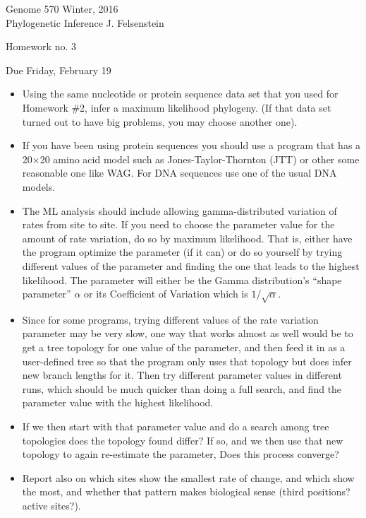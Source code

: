 \documentclass[12pt]{article}
\begin{document}
{\large
\noindent
Genome 570 \hfill Winter, 2016\\
Phylogenetic Inference \hfill J. Felsenstein\\
}

\vfill

\centerline{Homework no. 3}
\medskip

\centerline{Due Friday, February 19}
\bigskip

\begin{itemize}
\item Using the same nucleotide or protein sequence data set that you used
for Homework \#2, infer a maximum likelihood phylogeny.  (If that data set
turned out to have big problems, you may choose another one).
\item If you have been using protein sequences you should use a program that
has a 20$\times$20 amino acid model such as Jones-Taylor-Thornton (JTT) or
other some reasonable one like WAG.  For DNA sequences use one of the usual
DNA models.
\item The ML analysis should include allowing gamma-distributed variation
of rates from site to site.  If you need to choose the parameter value
for the amount of rate variation, do so by maximum likelihood.  That is,
either have the program optimize the parameter (if it can) or do so yourself
by trying different values of the parameter and finding the one that leads
to the highest likelihood.  The parameter will either be the Gamma
distribution's ``shape parameter'' $\alpha$ or its Coefficient of Variation
which is $1/\sqrt{\alpha}$.
\item Since for some programs, 
trying different values of the rate variation parameter may be
very slow, one way that works almost as well would be to get a tree topology
for one value of the parameter, and then feed it in as a user-defined tree
so that the program only uses that topology but does infer new branch lengths
for it.  Then try different parameter values in different runs, which should be
much quicker than doing a full search, and find the parameter value
with the highest likelihood.
\item If we then start with that parameter value and do a search among tree
topologies does the topology found differ?  If so, and we then use that
new topology to again re-estimate the parameter, Does this process converge?
\item Report also on which sites show the smallest rate of change, and
which show the most, and whether that pattern makes biological sense (third 
positions?  active sites?).

\end{itemize}
\end{document}
